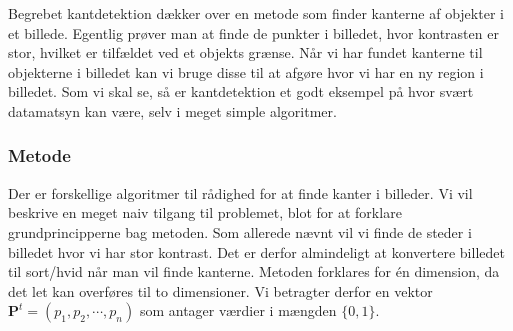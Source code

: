 {
Begrebet kantdetektion dækker over en metode som finder kanterne af
objekter i et billede. Egentlig prøver man at finde de punkter i
billedet, hvor kontrasten er stor, hvilket er tilfældet ved et objekts
grænse. Når vi har fundet kanterne til objekterne i billedet kan vi
bruge disse til at afgøre hvor vi har en ny region i billedet.  Som vi
skal se, så er kantdetektion et godt eksempel på hvor svært datamatsyn
kan være, selv i meget simple algoritmer.

\subsubsection*{Metode}
Der er forskellige algoritmer til rådighed for at finde kanter i
billeder\cite{SIOlsen}. Vi vil beskrive en meget naiv tilgang til
problemet, blot for at forklare grundprincipperne bag metoden. Som
allerede nævnt vil vi finde de steder i billedet hvor vi har stor
kontrast. Det er derfor almindeligt at konvertere billedet til sort/hvid
når man vil finde kanterne. Metoden forklares for én dimension, da det
let kan overføres til to dimensioner. Vi betragter derfor en vektor
$\mathbf{P}^t = (p_1, p_2, \cdots, p_n)$ som antager værdier i mængden
$\{0,1\}$.

}
